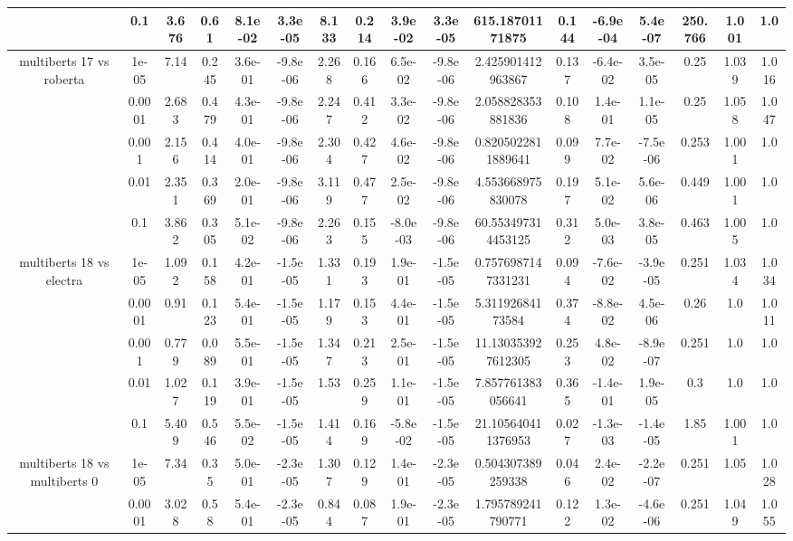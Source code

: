 \begin{tabular}{|c|c|c|c|c|c|c|c|c|c|c|c|c|c|c|c|c|}
 & 0.1 & 3.676 & 0.61 & 8.1e-02 & 3.3e-05 & 8.133 & 0.214 & 3.9e-02 & 3.3e-05 & 615.18701171875 & 0.144 & -6.9e-04 & 5.4e-07 & 250.766 & 1.001 & 1.0 \\
\hline
\multirow{5}{*}{multiberts 17 vs roberta } & 1e-05 & 7.14 & 0.245 & 3.6e-01 & -9.8e-06 & 2.268 & 0.166 & 6.5e-02 & -9.8e-06 & 2.425901412963867 & 0.137 & -6.4e-02 & 3.5e-05 & 0.25 & 1.039 & 1.016 \\
 & 0.0001 & 2.683 & 0.479 & 4.3e-01 & -9.8e-06 & 2.247 & 0.412 & 3.3e-02 & -9.8e-06 & 2.058828353881836 & 0.108 & 1.4e-01 & 1.1e-05 & 0.25 & 1.058 & 1.047 \\
 & 0.001 & 2.156 & 0.414 & 4.0e-01 & -9.8e-06 & 2.304 & 0.427 & 4.6e-02 & -9.8e-06 & 0.8205022811889641 & 0.099 & 7.7e-02 & -7.5e-06 & 0.253 & 1.001 & 1.0 \\
 & 0.01 & 2.351 & 0.369 & 2.0e-01 & -9.8e-06 & 3.119 & 0.477 & 2.5e-02 & -9.8e-06 & 4.553668975830078 & 0.197 & 5.1e-02 & 5.6e-06 & 0.449 & 1.001 & 1.0 \\
 & 0.1 & 3.862 & 0.305 & 5.1e-02 & -9.8e-06 & 2.263 & 0.155 & -8.0e-03 & -9.8e-06 & 60.553497314453125 & 0.312 & 5.0e-03 & 3.8e-05 & 0.463 & 1.005 & 1.0 \\
\hline
\multirow{5}{*}{multiberts 18 vs electra } & 1e-05 & 1.092 & 0.158 & 4.2e-01 & -1.5e-05 & 1.331 & 0.193 & 1.9e-01 & -1.5e-05 & 0.7576987147331231 & 0.094 & -7.6e-02 & -3.9e-05 & 0.251 & 1.034 & 1.034 \\
 & 0.0001 & 0.91 & 0.123 & 5.4e-01 & -1.5e-05 & 1.179 & 0.153 & 4.4e-01 & -1.5e-05 & 5.31192684173584 & 0.374 & -8.8e-02 & 4.5e-06 & 0.26 & 1.0 & 1.011 \\
 & 0.001 & 0.779 & 0.089 & 5.5e-01 & -1.5e-05 & 1.347 & 0.213 & 2.5e-01 & -1.5e-05 & 11.130353927612305 & 0.253 & 4.8e-02 & -8.9e-07 & 0.251 & 1.0 & 1.0 \\
 & 0.01 & 1.027 & 0.119 & 3.9e-01 & -1.5e-05 & 1.53 & 0.259 & 1.1e-01 & -1.5e-05 & 7.857761383056641 & 0.365 & -1.4e-01 & 1.9e-05 & 0.3 & 1.0 & 1.0 \\
 & 0.1 & 5.409 & 0.546 & 5.5e-02 & -1.5e-05 & 1.414 & 0.169 & -5.8e-02 & -1.5e-05 & 21.105640411376953 & 0.027 & -1.3e-03 & -1.4e-05 & 1.85 & 1.001 & 1.0 \\
\hline
\multirow{5}{*}{multiberts 18 vs multiberts 0} & 1e-05 & 7.34 & 0.35 & 5.0e-01 & -2.3e-05 & 1.307 & 0.129 & 1.4e-01 & -2.3e-05 & 0.504307389259338 & 0.046 & 2.4e-02 & -2.2e-07 & 0.251 & 1.05 & 1.028 \\
 & 0.0001 & 3.028 & 0.58 & 5.4e-01 & -2.3e-05 & 0.844 & 0.087 & 1.9e-01 & -2.3e-05 & 1.795789241790771 & 0.122 & 1.3e-02 & -4.6e-06 & 0.251 & 1.049 & 1.055 \\

\end{tabular}
